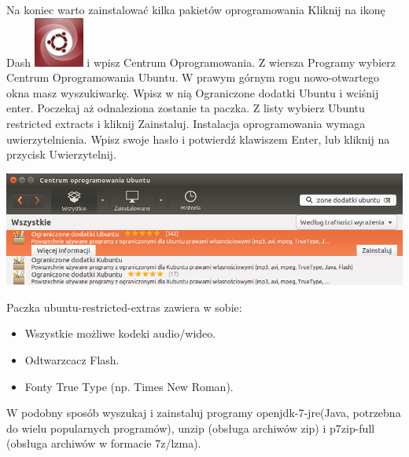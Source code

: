 Na koniec warto zainstalować kilka pakietów oprogramowania Kliknij na ikonę Dash \includegraphics[scale=0.35]{images/ikony_dash.png} i wpisz \textcolor{ubuntu_orange}{Centrum Oprogramowania}. Z wiersza \textcolor{ubuntu_orange}{Programy} wybierz \textcolor{ubuntu_orange}{Centrum Oprogramowania Ubuntu}. W prawym górnym rogu nowo-otwartego okna masz wyszukiwarkę. Wpisz w nią \textcolor{ubuntu_orange}{Ograniczone dodatki Ubuntu} i wciśnij enter. Poczekaj aż odnaleziona zostanie ta paczka. Z listy wybierz \textcolor{ubuntu_orange}{Ubuntu restricted extracts} i kliknij \textcolor{ubuntu_orange}{Zainstaluj}. Instalacja oprogramowania wymaga uwierzytelnienia. Wpisz swoje hasło i potwierdź klawiszem Enter, lub kliknij na przycisk \textcolor{ubuntu_orange}{Uwierzytelnij}.
\begin{center}
	\vspace{-10pt}
	\includegraphics[width=\linewidth]{images/pierwsze_uruchomienie_dodatki2.png}
\end{center}

Paczka \textcolor{ubuntu_orange}{ubuntu-restricted-extras} zawiera w sobie:
\begin{itemize}
\item Wszystkie możliwe kodeki audio/wideo.
\item Odtwarzcacz Flash.
\item Fonty True Type (np. Times New Roman).
\end{itemize}
W podobny sposób wyszukaj i zainstaluj programy \textcolor{ubuntu_orange}{openjdk-7-jre}(Java, potrzebna do wielu popularnych programów), \textcolor{ubuntu_orange}{unzip} (obsługa archiwów zip) i \textcolor{ubuntu_orange}{p7zip-full} (obsługa archiwów w formacie 7z/lzma).
\clearpage
